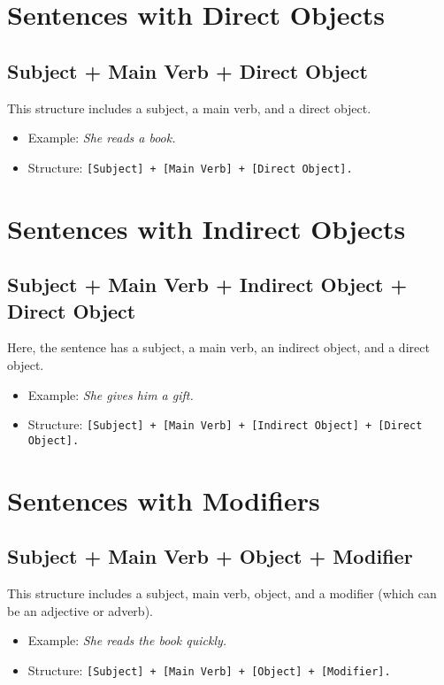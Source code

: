 \documentclass{book}
\begin{document}
\section{Sentences with Direct Objects}

\subsection{Subject + Main Verb + Direct Object}
This structure includes a subject, a main verb, and a direct object.
\begin{itemize}
	\item Example: \textit{She reads a book.}
	\item Structure: \texttt{[Subject] + [Main Verb] + [Direct Object].}
\end{itemize}

\section{Sentences with Indirect Objects}

\subsection{Subject + Main Verb + Indirect Object + Direct Object}
Here, the sentence has a subject, a main verb, an indirect object, and a direct object.
\begin{itemize}
	\item Example: \textit{She gives him a gift.}
	\item Structure: \texttt{[Subject] + [Main Verb] + [Indirect Object] + [Direct Object].}
\end{itemize}

\section{Sentences with Modifiers}

\subsection{Subject + Main Verb + Object + Modifier}
This structure includes a subject, main verb, object, and a modifier (which can be an adjective or adverb).
\begin{itemize}
	\item Example: \textit{She reads the book quickly.}
	\item Structure: \texttt{[Subject] + [Main Verb] + [Object] + [Modifier].}
\end{itemize}
\end{document}
